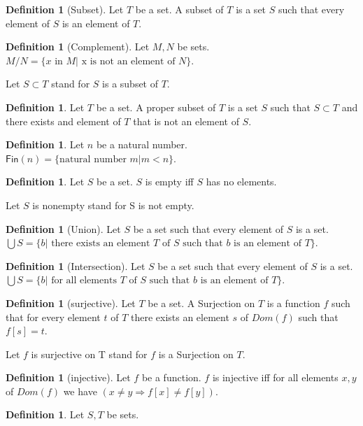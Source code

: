 \documentclass[10pt]{article}
\newenvironment{forthel}{\begin{leftbar}}{\end{leftbar}}
\newcommand{\Fin}{\mathsf{Fin}}
\theoremstyle{definition}
\newtheorem{definition}[theorem]{Definition}
\theoremstyle{plain}
\theoremstyle{remark}
\begin{document}
\begin{forthel}
	\begin{definition}[Subset]
		Let $T$ be a set. A subset of $T$ is a set $S$ such that every element of $S$ is an element of $T$.
	\end{definition}
	\begin{definition}[Complement]
		Let $M,N$ be sets. $M/N = \{x \text{ in }M | \text{ x is not an element of }N\}$.
	\end{definition}
	Let $S\subset T$ stand for $S$ is a subset of $T$.
	\begin{definition}
		Let $T$ be a set. A proper subset of $T$ is a set $S$ such that $S\subset T$ and there exists and element of $T$ that is not an element of $S$.
	\end{definition}
	\begin{definition}
		Let $n$ be a natural number. $\Fin(n) = \{\text{natural number }m | m < n\}$.
	\end{definition}
	\begin{definition}
		Let $S$ be a set. $S$ is empty iff $S$ has no elements.
	\end{definition}
	Let $S$ is nonempty stand for S is not empty.
	\begin{definition}[Union]
		Let $S$ be a set such that every element of $S$ is a set. \\
		$\bigcup S = \{b |\text{ there exists an element }T\text{ of }S\text{ such that }b\text{ is an element of }T \}$.
	\end{definition}
	\begin{definition}[Intersection]
		Let $S$ be a set such that every element of $S$ is a set. \\
		$\bigcup S = \{b |\text{ for all elements }T\text{ of }S\text{ such that }b\text{ is an element of }T \}$.
	\end{definition}
	\begin{definition}[surjective]
		Let $T$ be a set. A Surjection on $T$ is a function $f$ such that for every element $t$ of $T$ there exists an element $s$ of $Dom(f)$ such that $f[s]=t$.
	\end{definition}
	Let $f$ is surjective on T stand for $f$ is a Surjection on $T$.
	\begin{definition}[injective]
		Let $f$ be a function. $f$ is injective iff for all elements $x,y$ of $Dom(f)$ we have $(x \neq y \Rightarrow f[x] \neq f[y])$.
	\end{definition}
	\begin{definition}
		Let $S,T$ be sets. \\

\end{definition}
\end{forthel}
\end{document}
